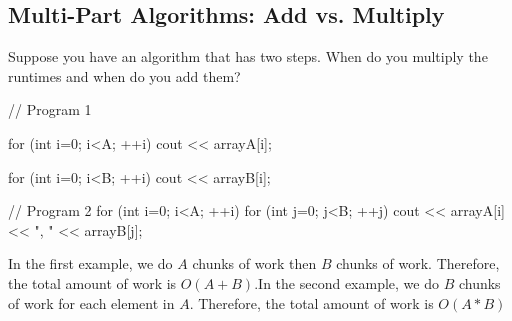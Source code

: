 \documentclass{report}
\begin{document}
    \bigbreak \noindent 
    \subsection{Multi-Part Algorithms: Add vs. Multiply}
    \bigbreak \noindent 
    Suppose you have an algorithm that has two steps. When do you multiply the runtimes and when do you add them?
    \bigbreak \noindent 
    \begin{cppcode}
    // Program 1

    for (int i=0; i<A; ++i) {
        cout << arrayA[i];
    }

    for (int i=0; i<B; ++i) {
        cout << arrayB[i];
    }

    // Program 2
    for (int i=0; i<A; ++i) {
        for (int j=0; j<B; ++j) {
            cout << arrayA[i] << ", " << arrayB[j];
        }
    }
    \end{cppcode}
    \pagebreak \bigbreak \noindent 
    In the first example, we do $A$ chunks of work then $B$ chunks of work. Therefore, the total amount of work is $O(A + B)$.In the second example, we do $B$ chunks of work for each element in $A$. Therefore, the total amount of work is $O(A * B)$

    \bigbreak \noindent 
\end{document}
